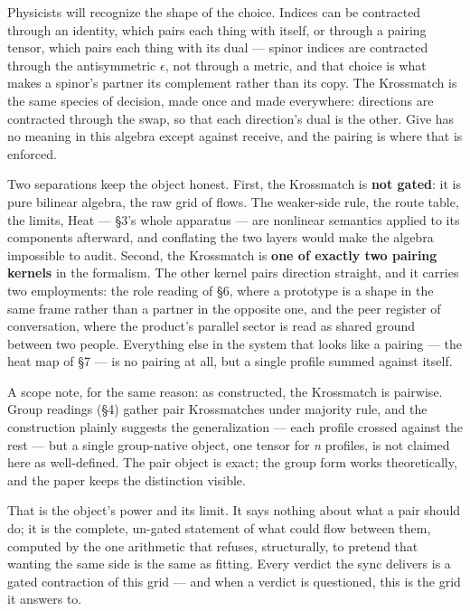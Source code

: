 Physicists will recognize the shape of the choice. Indices can be
contracted through an identity, which pairs each thing with itself, or
through a pairing tensor, which pairs each thing with its dual ---
spinor indices are contracted through the antisymmetric $\epsilon$, not through a
metric, and that choice is what makes a spinor's partner its complement
rather than its copy. The Krossmatch is the same species of decision,
made once and made everywhere: directions are contracted through the
swap, so that each direction's dual is the other. Give has no meaning in
this algebra except against receive, and the pairing is where that is
enforced.

Two separations keep the object honest. First, the Krossmatch is
\textbf{not gated}: it is pure bilinear algebra, the raw grid of flows.
The weaker-side rule, the route table, the limits, Heat --- \S 3's whole
apparatus --- are nonlinear semantics applied to its components
afterward, and conflating the two layers would make the algebra
impossible to audit. Second, the Krossmatch is \textbf{one of exactly
two pairing kernels} in the formalism. The other kernel pairs direction
straight, and it carries two employments: the role reading of \S 6, where
a prototype is a shape in the same frame rather than a partner in the
opposite one, and the peer register of conversation, where the product's
parallel sector is read as shared ground between two people. Everything
else in the system that looks like a pairing --- the heat map of \S 7 ---
is no pairing at all, but a single profile summed against itself.

A scope note, for the same reason: as constructed, the Krossmatch is
pairwise. Group readings (\S 4) gather pair Krossmatches under majority
rule, and the construction plainly suggests the generalization --- each
profile crossed against the rest --- but a single group-native object,
one tensor for \emph{n} profiles, is not claimed here as well-defined.
The pair object is exact; the group form works theoretically, and the
paper keeps the distinction visible.

That is the object's power and its limit. It says nothing about what a
pair should do; it is the complete, un-gated statement of what could
flow between them, computed by the one arithmetic that refuses,
structurally, to pretend that wanting the same side is the same as
fitting. Every verdict the sync delivers is a gated contraction of this
grid --- and when a verdict is questioned, this is the grid it answers
to.


